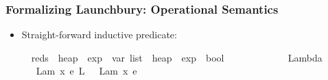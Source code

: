 \documentclass{beamer}
\begin{document}
\begin{frame}
\frametitle{Formalizing Launchbury: Operational Semantics}

\begin{itemize}
\item Straight-forward inductive predicate:

\begin{isabelle}
\isamarkupfalse%
\isanewline
\ \ reds\ {\isacharcolon}{\isacharcolon}\ {\isachardoublequoteopen}heap\ {\isasymRightarrow}\ exp\ {\isasymRightarrow}\ var\ list\ {\isasymRightarrow}\ heap\ {\isasymRightarrow}\ exp\ {\isasymRightarrow}\ bool{\isachardoublequoteclose}\isanewline
\ \ {\isacharparenleft}{\isachardoublequoteopen}{\isacharunderscore}\ {\isacharcolon}\ {\isacharunderscore}\ {\isasymDown}\isactrlbsub {\isacharunderscore}\isactrlesub \ {\isacharunderscore}\ {\isacharcolon}\ {\isacharunderscore}{\isachardoublequoteclose}\ {\isacharbrackleft}{}{}{\isacharcomma}{}{}{\isacharcomma}{}{}{\isacharcomma}{}{}{\isacharbrackright}\ {}{}{\isacharparenright}\isanewline
{}\isanewline
\ \ Lambda{\isacharcolon}%
\ {\isachardoublequoteopen}{\isasymGamma}\ {\isacharcolon}\ {\isacharparenleft}Lam\ {\isacharbrackleft}x{\isacharbrackright}{\isachardot}\ e{\isacharparenright}\ {\isasymDown}\isactrlbsub L\isactrlesub \ {\isasymGamma}\ {\isacharcolon}\ {\isacharparenleft}Lam\ {\isacharbrackleft}x{\isacharbrackright}{\isachardot}\ e{\isacharparenright}{\isachardoublequoteclose}\ \isanewline

\end{isabelle}
\end{itemize}
\end{frame}
\end{document}

